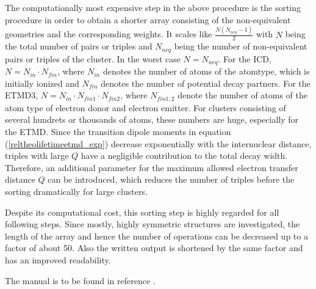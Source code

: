 The computationally most expensive step in the above procedure is the
sorting procedure in order to obtain a shorter array consisting of the
non-equivalent geometries and the corresponding weights. It scales like
$\frac{N(N_{neq}-1)}{2}$ with $N$ being the total number of pairs or triples
and $N_{neq}$ being the number of non-equivalent pairs or triples of the cluster.
In the worst case $N=N_{neq}$.
For the \ac{ICD}, $N=N_{in}\cdot N_{fin}$, where $N_{in}$
denotes the number of atoms of the atomtype, which is initially ionized
and $N_{fin}$ denotes the number of potential decay partners. For the
\ac{ETMD}3, $N=N_{in} \cdot N_{fin1} \cdot N_{fin2}$, where $N_{fin1,2}$
denote the number of atoms of the atom type of electron donor and electron
emitter. For clusters consisting of several hundrets or thousands of atoms, these
numbers are huge, especially for the ETMD. Since the transition dipole moments
in equation (\ref{reltheolifetimeetmd_exp}) decrease exponentially with the
internuclear distance, triples with large $Q$ have a negligible contribution
to the total decay width. Therefore, an additional parameter for the maximum
allowed electron transfer distance $Q$ can be introduced,
which reduces the number of triples before the sorting dramatically for large
clusters.

Despite its computational cost, this sorting step is highly regarded for
all following steps.
Since mostly, highly symmetric structures are investigated, the length of
the array and hence the number of operations can be decreased up to a
factor of about 50. Also the written output is shortened by the same factor
and has an improved readability.

The manual is to be found in reference \cite{HARDRoC}.
